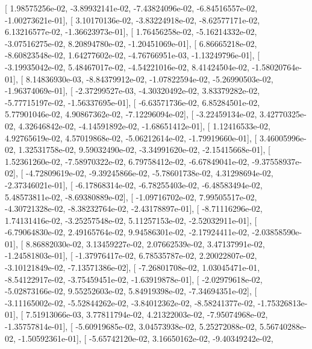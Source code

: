\documentclass{article}
\begin{document}
       [  1.98575256e-02,  -3.89932141e-02,  -7.43824096e-02,
         -6.84516557e-02,  -1.00273621e-01],
       [  3.10170136e-02,  -3.83224918e-02,  -8.62577171e-02,
          6.13216577e-02,  -1.36623973e-01],
       [  1.76456258e-02,  -5.16214332e-02,  -3.07516275e-02,
          8.20894780e-02,  -1.20451069e-01],
       [  6.86665218e-02,  -8.60823548e-02,   1.64277602e-02,
         -4.76766951e-03,  -1.13249796e-01],
       [ -3.19935042e-02,   5.48467017e-02,  -4.54221016e-02,
          8.41424504e-02,  -1.58020764e-01],
       [  8.14836930e-03,  -8.84379912e-02,  -1.07822594e-02,
         -5.26990503e-02,  -1.96374069e-01],
       [ -2.37299527e-03,  -4.30320492e-02,   3.83379282e-02,
         -5.77715197e-02,  -1.56337695e-01],
       [ -6.63571736e-02,   6.85284501e-02,   5.77901046e-02,
          4.90867362e-02,  -7.12296094e-02],
       [ -3.22459134e-02,   3.42770325e-02,   4.32646842e-02,
         -4.14591892e-02,  -1.68651412e-01],
       [  1.12416533e-02,   4.92765619e-02,   4.57019868e-02,
         -5.06212614e-02,  -1.79919660e-01],
       [  3.46005996e-02,   1.32531758e-02,   9.59032490e-02,
         -3.34991620e-02,  -2.15415668e-01],
       [  1.52361260e-02,  -7.58970322e-02,   6.79758412e-02,
         -6.67849041e-02,  -9.37558937e-02],
       [ -4.72809619e-02,  -9.39245866e-02,  -5.78601738e-02,
          4.31298694e-02,  -2.37346021e-01],
       [ -6.17868314e-02,  -6.78255403e-02,  -6.48583494e-02,
          5.48573811e-02,  -8.69380889e-02],
       [ -1.09716702e-02,   7.99505517e-02,  -4.30721328e-02,
         -8.38232764e-02,  -2.43178897e-01],
       [ -8.71116296e-02,   1.74131416e-02,  -3.25257548e-02,
          5.11257153e-02,  -2.52032911e-01],
       [ -6.79064830e-02,   2.49165764e-02,   9.94586301e-02,
         -2.17924411e-02,  -2.03858590e-01],
       [  8.86882030e-02,   3.13459227e-02,   2.07662539e-02,
          3.47137991e-02,  -1.24581803e-01],
       [ -1.37976417e-02,   6.78535787e-02,   2.20022807e-02,
         -3.10121849e-02,  -7.13571386e-02],
       [ -7.26801708e-02,   1.03045471e-01,  -8.54122917e-02,
         -3.75459451e-02,  -1.63919878e-01],
       [ -2.02979618e-02,  -5.02873166e-02,   9.55252603e-02,
          5.84919398e-02,  -7.34694351e-02],
       [ -3.11165002e-02,  -5.52844262e-02,  -3.84012362e-02,
         -8.58241377e-02,  -1.75326813e-01],
       [  7.51913066e-03,   3.77811794e-02,   4.21322003e-02,
         -7.95074968e-02,  -1.35757814e-01],
       [ -5.60919685e-02,   3.04573938e-02,   5.25272088e-02,
          5.56740288e-02,  -1.50592361e-01],
       [ -5.65742120e-02,   3.16650162e-02,  -9.40349242e-02,
\end{document}
